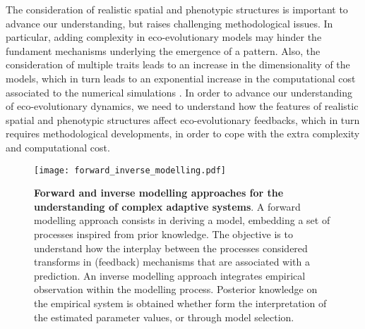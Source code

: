 % 
% 
The consideration of realistic spatial and phenotypic structures is important to advance our understanding, but raises challenging methodological issues. 
% 
In particular, adding complexity in eco-evolutionary models may hinder the fundament mechanisms underlying the emergence of a pattern.
% 
Also, the consideration of multiple traits leads to an increase in the dimensionality of the models, which in turn leads to an exponential increase in the computational cost associated to the numerical simulations \citep{Bellman1957}.
% 
In order to advance our understanding of eco-evolutionary dynamics, we need to understand how the features of realistic spatial and phenotypic structures affect eco-evolutionary feedbacks, which in turn requires methodological developments, in order to cope with the extra complexity and computational cost.
% 

\begin{figure}[t]
    \centering
    \texttt{[image: forward\_inverse\_modelling.pdf]}
    \caption{\textbf{Forward and inverse modelling approaches for the understanding of complex adaptive systems}. A forward modelling approach consists in deriving a model, embedding a set of processes inspired from prior knowledge. The objective is to understand how the interplay between the processes considered transforms in (feedback) mechanisms that are associated with a prediction. An inverse modelling approach integrates empirical observation within the modelling process. Posterior knowledge on the empirical system is obtained whether form the interpretation of the estimated parameter values, or through model selection.
    }
    \label{fig:forward_inverse_modelling}
\end{figure}

